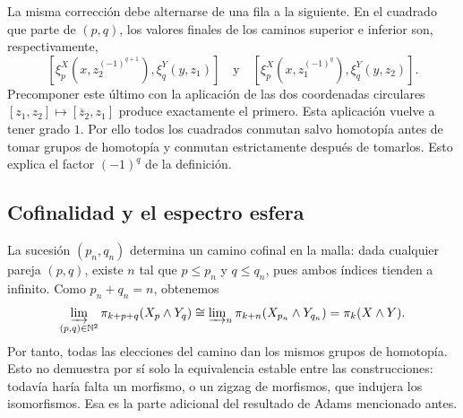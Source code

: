 La misma corrección debe alternarse de una fila a la siguiente. En el cuadrado que parte de $(p,q)$, los valores finales de los caminos superior e inferior son, respectivamente,
\[
[\xi^X_p(x,z_2^{(-1)^{q+1}}),\xi^Y_q(y,z_1)]
\quad\text{y}\quad
[\xi^X_p(x,z_1^{(-1)^q}),\xi^Y_q(y,z_2)].
\] Precomponer este último con la aplicación de las dos coordenadas circulares $[z_1,z_2]\mapsto[\overline z_2,z_1]$ produce exactamente el primero. Esta aplicación vuelve a tener grado $1$. Por ello todos los cuadrados conmutan salvo homotopía antes de tomar grupos de homotopía y conmutan estrictamente después de tomarlos. Esto explica el factor $(-1)^q$ de la definición.

\subsection{Cofinalidad y el espectro esfera}

La sucesión $(p_n,q_n)$ determina un camino cofinal en la malla: dada cualquier pareja $(p,q)$, existe $n$ tal que $p\le p_n$ y $q\le q_n$, pues ambos índices tienden a infinito. Como $p_n+q_n=n$, obtenemos
\[
\varinjlim_{(p,q)\in\mathbb N^2}
\pi_{k+p+q}(X_p\wedge Y_q)
\cong \varinjlim\nolimits_n\pi_{k+n}(X_{p_n}\wedge Y_{q_n})
=\pi_k(X\wedge Y).
\]
Por tanto, todas las elecciones del camino dan los mismos grupos de homotopía. Esto no demuestra por sí solo la equivalencia estable entre las construcciones: todavía haría falta un morfismo, o un zigzag de morfismos, que indujera los isomorfismos. Esa es la parte adicional del resultado de Adams mencionado antes.

